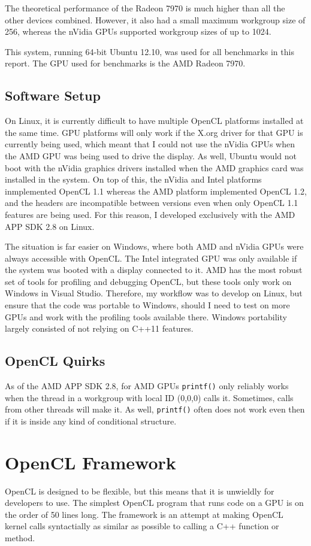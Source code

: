\documentclass{article}
\begin{document}
The theoretical performance of the Radeon 7970 is much higher than all the other devices combined. However, it also had a small maximum workgroup size of 256, whereas the nVidia GPUs supported workgroup sizes of up to 1024.

This system, running 64-bit Ubuntu 12.10, was used for all benchmarks in this report. The GPU used for benchmarks is the AMD Radeon 7970.

\subsection{Software Setup}
On Linux, it is currently difficult to have multiple OpenCL platforms installed at the same time. GPU platforms will only work if the X.org driver for that GPU is currently being used, which meant that I could not use the nVidia GPUs when the AMD GPU was being used to drive the display. As well, Ubuntu would not boot with the nVidia graphics drivers installed when the AMD graphics card was installed in the system. On top of this, the nVidia and Intel platforms inmplemented OpenCL 1.1 whereas the AMD platform implemented OpenCL 1.2, and the headers are incompatible between versions even when only OpenCL 1.1 features are being used. For this reason, I developed exclusively with the AMD APP SDK 2.8 on Linux.

The situation is far easier on Windows, where both AMD and nVidia GPUs were always accessible with OpenCL. The Intel integrated GPU was only available if the system was booted with a display connected to it. AMD has the most robust set of tools for profiling and debugging OpenCL, but these tools only work on Windows in Visual Studio. Therefore, my workflow was to develop on Linux, but ensure that the code was portable to Windows, should I need to test on more GPUs and work with the profiling tools available there. Windows portability largely consisted of not relying on C++11 features.

\subsection{OpenCL Quirks}
As of the AMD APP SDK 2.8, for AMD GPUs \texttt{printf()} only reliably works when the thread in a workgroup with local ID (0,0,0) calls it. Sometimes, calls from other threads will make it. As well, \texttt{printf()} often does not work even then if it is inside any kind of conditional structure.

\section{OpenCL Framework}
OpenCL is designed to be flexible, but this means that it is unwieldly for developers to use. The simplest OpenCL program that runs code on a GPU is on the order of 50 lines long. The framework is an attempt at making OpenCL kernel calls syntactially as similar as possible to calling a C++ function or method.
\end{document}
